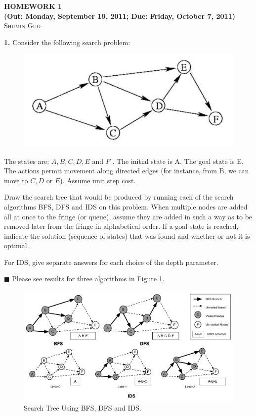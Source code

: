 \documentclass{article}
\begin{document}
\begin{center}
\textbf{\large{
HOMEWORK 1 \\
(Out: Monday, September 19, 2011; Due: Friday, October 7, 2011) \\}}
\textsc{\Large{Shumin Guo}}
\end{center}

\textbf{1.} Consider the following search problem:

\begin{figure}[ht]
  \centering
  \includegraphics[width=.7\textwidth]{hwk1-1.pdf}
\end{figure}

The states are: $A, B, C, D, E$ and $F$ . The initial state is A. The goal
state is E. The actions permit movement along directed edges (for
instance, from B, we can move to $C, D$ or $E$). Assume unit step cost.

Draw the search tree that would be produced by running each of the
search algorithms BFS, DFS and IDS on this problem. When multiple
nodes are added all at once to the fringe (or queue), assume they are
added in such a way as to be removed later from the fringe in
alphabetical order. If a goal state is reached, indicate the solution
(sequence of states) that was found and whether or not it is optimal.

For IDS, give separate answers for each choice of the depth parameter.

\sffamily\upshape\selectfont
$\blacksquare$ Please see results for three algorithms in Figure \ref{fig:ai-hwk1-1}. 
\begin{figure}[h]
  \centering 
  \includegraphics[width=\linewidth]{AI-HWK-1_1.pdf}
  \caption{Search Tree Using BFS, DFS and IDS.}
  \label{fig:ai-hwk1-1}
\end{figure}
\end{document}
